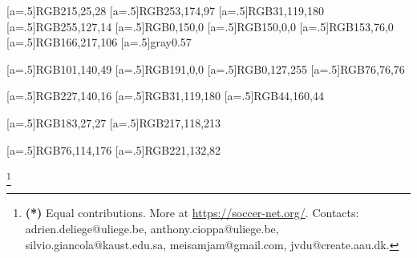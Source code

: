 \documentclass[final]{cvsports}
\begin{document}
\newcommand{\mysection}[1]{\vspace{2pt}\noindent\textbf{#1}}
\newcommand{\Table}[1]{Table~\ref{tab:#1}}
\newcommand{\Figure}[1]{Figure~\ref{fig:#1}}
\newcommand{\Equation}[1]{Equation~\eqref{eq:#1}}
\newcommand{\Equations}[2]{Equations \eqref{eq:#1} and \eqref{eq:#2}}
\newcommand{\Section}[1]{Section~\ref{sec:#1}}
\newcommand{\SoccerNet}{SoccerNet~\cite{Giancola_2018_CVPR_Workshops}\xspace}
\newcommand{\ActivityNet}{ActivityNet~\cite{caba2015activitynet}\xspace}

\newcommand{\TODO}[1]{\textcolor{red}{[TODO:#1]}}

\newcommand\blfootnote[1]{\begingroup
  \renewcommand\thefootnote{}\footnote{#1}\addtocounter{footnote}{-1}\endgroup
}


\definecolor{myred}[a=.5]{RGB}{215,25,28} 
\definecolor{myorange}[a=.5]{RGB}{253,174,97}
\definecolor{anthoblue}[a=.5]{RGB}{31,119,180}
\definecolor{anthoorange}[a=.5]{RGB}{255,127,14}
\definecolor{anthogreen}[a=.5]{RGB}{0,150,0}
\definecolor{anthored}[a=.5]{RGB}{150,0,0}
\definecolor{anthobrown}[a=.5]{RGB}{153,76,0}
\definecolor{mygreen}[a=.5]{RGB}{166,217,106} 
\definecolor{mygray}[a=.5]{gray}{0.57}

\definecolor{newanthogreen}[a=.5]{RGB}{101,140,49}
\definecolor{newanthored}[a=.5]{RGB}{191,0,0}
\definecolor{newanthoblue}[a=.5]{RGB}{0,127,255}
\definecolor{newanthogray}[a=.5]{RGB}{76,76,76}

\definecolor{newanthoorangespotting}[a=.5]{RGB}{227,140,16}
\definecolor{newanthobluespotting}[a=.5]{RGB}{31,119,180}
\definecolor{newanthogreenspotting}[a=.5]{RGB}{44,160,44}

\definecolor{newanthoredreplay}[a=.5]{RGB}{183,27,27}
\definecolor{newanthopinkreplay}[a=.5]{RGB}{217,118,213}

\definecolor{newjacobblue}[a=.5]{RGB}{76,114,176}
\definecolor{newjacoborange}[a=.5]{RGB}{221,132,82}

\newcommand{\whitebox}{\hfill\textcolor{white}{\rule[1mm]{1.8mm}{2.8mm}}\hfill}
\newcommand{\redbox}{\hfill\textcolor{myred}{\rule[1mm]{1.8mm}{2.8mm}}\hfill}
\newcommand{\orangebox}{\hfill\textcolor{myorange}{\rule[1mm]{1.8mm}{2.8mm}}\hfill}
\newcommand{\greenbox}{\hfill\textcolor{mygreen}{\rule[1mm]{1.8mm}{2.8mm}}\hfill}
\newcommand{\graybox}{\hfill\textcolor{mygray}{\rule[1mm]{1.8mm}{2.8mm}}\hfill}
\newcommand{\BG}[1]{\textbf{{\color{red}[BG: #1]}}}




\blfootnote{\textbf{(*)} Equal contributions. More at \url{https://soccer-net.org/}. Contacts: adrien.deliege@uliege.be, anthony.cioppa@uliege.be, silvio.giancola@kaust.edu.sa, meisamjam@gmail.com, jvdu@create.aau.dk.}
\end{document}
